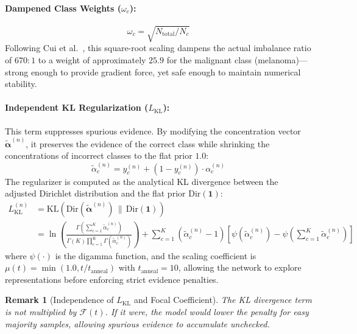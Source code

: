 \documentclass[letterpaper]{article} %
\newcommand{\Dir}{\text{Dir}}
\newcommand{\KL}{\text{KL}}
\newtheorem{remark}{Remark}
\begin{document}
\paragraph{Dampened Class Weights ($\omega_c$):}
\begin{equation}\label{eq:class_weights}
    \omega_c = \sqrt{N_{\text{total}} / N_c}
\end{equation}
Following Cui et al.~\cite{cui2019class}, this square-root scaling dampens the actual imbalance ratio of $670{:}1$ to a weight of approximately $25.9$ for the malignant class (melanoma)---strong enough to provide gradient force, yet safe enough to maintain numerical stability.

\paragraph{Independent KL Regularization ($L_{\text{KL}}$):}
This term suppresses spurious evidence. By modifying the concentration vector $\tilde{\bm{\alpha}}^{(n)}$, it preserves the evidence of the correct class while shrinking the concentrations of incorrect classes to the flat prior $1.0$:
\begin{equation}
    \tilde{\alpha}_c^{(n)} = y_c^{(n)} + (1 - y_c^{(n)}) \cdot \alpha_c^{(n)}
\end{equation}
The regularizer is computed as the analytical KL divergence between the adjusted Dirichlet distribution and the flat prior $\Dir(\bm{1})$:
\begin{align}
    L_{\text{KL}}^{(n)} &= \KL\!\left(\Dir(\tilde{\bm{\alpha}}^{(n)}) \,\|\, \Dir(\bm{1})\right) \nonumber \\
    &= \ln \left( \frac{\Gamma\left(\sum_{c=1}^K \tilde{\alpha}_c^{(n)}\right)}{\Gamma(K) \prod_{c=1}^K \Gamma(\tilde{\alpha}_c^{(n)})} \right) + \sum_{c=1}^K (\tilde{\alpha}_c^{(n)} - 1)\left[\psi(\tilde{\alpha}_c^{(n)}) - \psi\!\left(\sum_{c=1}^K \tilde{\alpha}_c^{(n)}\right)\right] \label{eq:kl_loss_n}
\end{align}
where $\psi(\cdot)$ is the digamma function, and the scaling coefficient is $\mu(t) = \min(1.0, t / t_{\text{anneal}})$ with $t_{\text{anneal}} = 10$, allowing the network to explore representations before enforcing strict evidence penalties.

\begin{remark}[Independence of $L_{\text{KL}}$ and Focal Coefficient]
The KL divergence term is not multiplied by $\mathcal{F}(t)$. If it were, the model would lower the penalty for easy majority samples, allowing spurious evidence to accumulate unchecked.
\end{remark}
\end{document}
